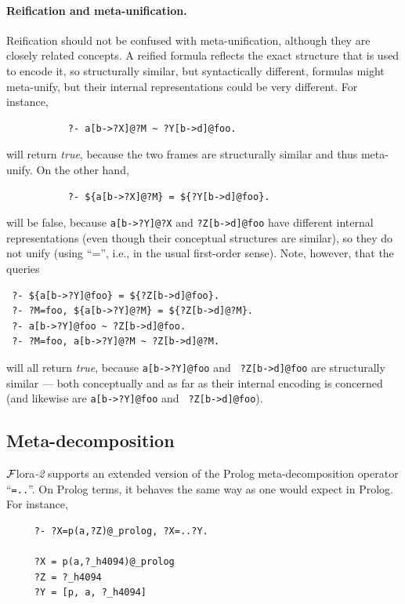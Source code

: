 \documentclass[11pt]{article}
\newcommand{\FLORA}{{\mbox{\sc ${\cal F}${lora}\rm\emph{-2}}}\xspace}
\begin{document}
\paragraph{Reification and meta-unification.}
Reification should not be confused with meta-unification, although they are
closely related concepts. A reified formula reflects the exact structure that is used
to encode it, so structurally similar, but syntactically different, formulas
might meta-unify, but their internal representations could be very different.
For instance, 
\begin{verbatim}
           ?- a[b->?X]@?M ~ ?Y[b->d]@foo.
\end{verbatim}
will return \emph{true}, because the two frames are structurally similar
and thus meta-unify. On the other hand,
\begin{verbatim}
           ?- ${a[b->?X]@?M} = ${?Y[b->d]@foo}.
\end{verbatim}
will be false, because {\tt a[b->?Y]@?X} and {\tt ?Z[b->d]@foo} have different
internal representations (even though their conceptual structures are
similar), so they do not unify (using ``='', i.e., in the usual
first-order sense). Note, however, that the queries
\begin{verbatim}
 ?- ${a[b->?Y]@foo} = ${?Z[b->d]@foo}.
 ?- ?M=foo, ${a[b->?Y]@?M} = ${?Z[b->d]@?M}.
 ?- a[b->?Y]@foo ~ ?Z[b->d]@foo.
 ?- ?M=foo, a[b->?Y]@?M ~ ?Z[b->d]@?M.
\end{verbatim}
will all return \emph{true}, because {\tt a[b->?Y]@foo} and {\tt
  ?Z[b->d]@foo} are structurally similar --- both conceptually and as far as
  their
internal encoding is concerned (and likewise are {\tt a[b->?Y]@foo} and {\tt
  ?Z[b->d]@foo}).

\subsection{Meta-decomposition}\label{sec-meta-decomp}

\FLORA supports an extended version of the Prolog meta-decomposition
operator ``{\tt =..}''. On Prolog terms, it behaves the same way as one
would expect in Prolog. For instance, 
\begin{verbatim}
     ?- ?X=p(a,?Z)@_prolog, ?X=..?Y.
 
     ?X = p(a,?_h4094)@_prolog
     ?Z = ?_h4094
     ?Y = [p, a, ?_h4094]
\end{verbatim}
\end{document}
